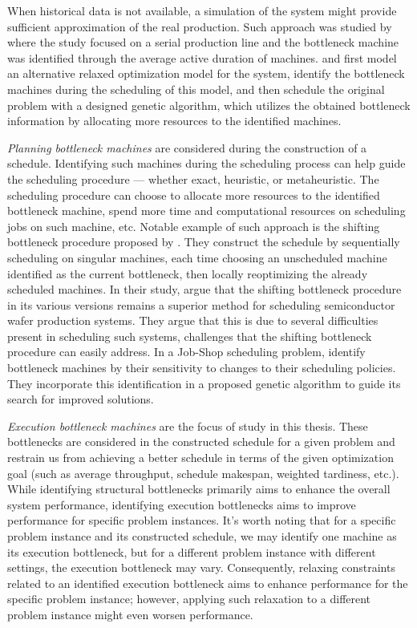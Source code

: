When historical data is not available,
a simulation of the system might provide sufficient approximation of the real production.
Such approach was studied by \citet{Roser2001} where the study focused on a serial production line
and the bottleneck machine was identified through the average active duration of machines.
\citet{Zhang2008a} and \citet{Zhang2012} first model an alternative relaxed optimization model for the system,
identify the bottleneck machines during the scheduling of this model,
and then schedule the original problem with a designed genetic algorithm,
which utilizes the obtained bottleneck information by allocating more resources to the identified machines.

\emph{Planning bottleneck machines} are considered during the construction of a schedule.
Identifying such machines during the scheduling process can help guide the scheduling procedure
--- whether exact, heuristic, or metaheuristic.
The scheduling procedure can choose to allocate more resources to the identified bottleneck machine,
spend more time and computational resources on scheduling jobs on such machine, etc.
Notable example of such approach is the shifting bottleneck procedure proposed by \citet{Adams1988}.
They construct the schedule by sequentially scheduling on singular machines,
each time choosing an unscheduled machine identified as the current bottleneck,
then locally reoptimizing the already scheduled machines.
In their study, \citet{Mnch2010} argue that the shifting bottleneck procedure in its various versions
remains a superior method for scheduling semiconductor wafer production systems.
They argue that this is due to several difficulties present in scheduling such systems,
challenges that the shifting bottleneck procedure can easily address.
In a Job-Shop scheduling problem,
\citet{Zhang2008b} identify bottleneck machines by their sensitivity to changes to their scheduling policies.
They incorporate this identification in a proposed genetic algorithm to guide its search for improved solutions.

\emph{Execution bottleneck machines} are the focus of study in this thesis.
These bottlenecks are considered in the constructed schedule for a given problem
and restrain us from achieving a better schedule in terms of the given optimization goal
(such as average throughput, schedule makespan, weighted tardiness, etc.).
While identifying structural bottlenecks primarily aims to enhance the overall system performance,
identifying execution bottlenecks aims to improve performance for specific problem instances.
It's worth noting that for a specific problem instance and its constructed schedule,
we may identify one machine as its execution bottleneck,
but for a different problem instance with different settings,
the execution bottleneck may vary.
Consequently, relaxing constraints related to an identified execution bottleneck
aims to enhance performance for the specific problem instance;
however, applying such relaxation to a different problem instance might even worsen performance.

